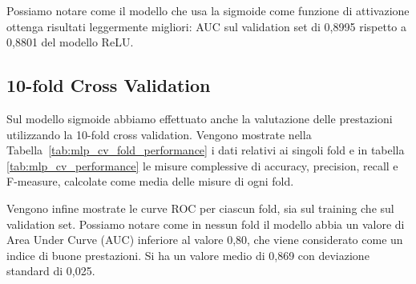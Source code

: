 Possiamo notare come il modello che usa la sigmoide come funzione di 
attivazione ottenga risultati leggermente migliori: AUC sul validation set di 
0,8995 rispetto a 0,8801 del modello ReLU. 

\subsection{10-fold Cross Validation}

Sul modello sigmoide abbiamo effettuato anche la valutazione delle prestazioni 
utilizzando la 10-fold cross validation. Vengono mostrate nella 
Tabella~\ref{tab:mlp_cv_fold_performance} i dati relativi ai singoli fold e in 
tabella \ref{tab:mlp_cv_performance} le misure complessive di accuracy, 
precision, recall e F-measure, calcolate come media delle misure di ogni fold. 

Vengono infine mostrate le curve ROC per ciascun fold, sia sul training che 
sul validation set. Possiamo notare come in nessun fold il modello abbia un 
valore di Area Under Curve (AUC) inferiore al valore 0,80, che viene 
considerato come un indice di buone prestazioni. Si ha un valore medio di 
0,869 con deviazione standard di 0,025.

